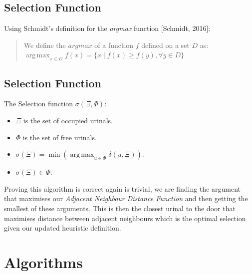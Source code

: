 \documentclass{article}
\DeclareMathOperator*{\argmax}{arg\,max}
\begin{document}
\subsection{Selection Function}
Using Schmidt's  definition for the \textit{argmax} function [Schmidt, 2016]:
\begin{quote}
    We define the $argmax$ of a function $f$ defined on a set $D$ as:
    \centering
    $\argmax_{x \in D} f(x) = \{x \mid f(x) \geq f(y), \forall y \in D\}$

\end{quote}
\begin{framed}
    \section*{Selection Function}
      The Selection function $\sigma(\Xi, \Phi)$:
      \begin{itemize}
          \item $\Xi$ is the set of occupied urinals.
          \item $\Phi$ is the set of free urinals.
          \item $\sigma(\Xi) = \min(\argmax_{u \in \Phi} \delta(u, \Xi))$.
          \item $\sigma(\Xi) \in \Phi$.
      \end{itemize}
  \end{framed}
Proving this algorithm is correct again is trivial, we are finding the argument that maximises our \textit{Adjacent Neighbour Distance Function} and then getting the smallest of these arguments. This is then the closest urinal to the door that maximises distance between adjacent neighbours which is the optimal selection given our updated heuristic definition. \hfill\qedsymbol
\section{Algorithms}
\end{document}
